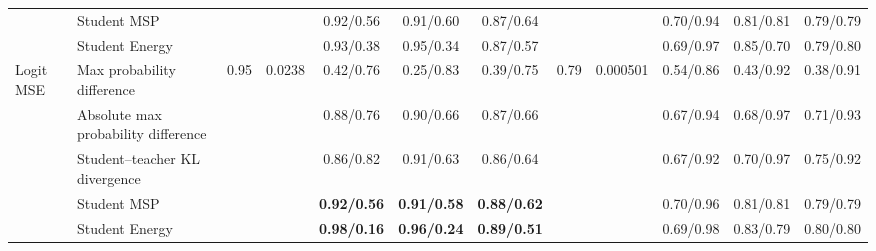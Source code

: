 \documentclass[border=2pt]{standalone}
\begin{document}
\begin{tabular}{llcccccccccc}
 & Student MSP &  &  & 0.92/0.56 & 0.91/0.60 & 0.87/0.64 &  &  & 0.70/0.94 & 0.81/0.81 & 0.79/0.79 \\
 & Student Energy &  &  & 0.93/0.38 & 0.95/0.34 & 0.87/0.57 &  &  & 0.69/0.97 & 0.85/0.70 & 0.79/0.80 \\
\addlinespace
Logit MSE & Max probability difference & 0.95 & 0.0238 & 0.42/0.76 & 0.25/0.83 & 0.39/0.75 & 0.79 & 0.000501 & 0.54/0.86 & 0.43/0.92 & 0.38/0.91 \\
 & Absolute max probability difference &  &  & 0.88/0.76 & 0.90/0.66 & 0.87/0.66 &  &  & 0.67/0.94 & 0.68/0.97 & 0.71/0.93 \\
 & Student--teacher KL divergence &  &  & 0.86/0.82 & 0.91/0.63 & 0.86/0.64 &  &  & 0.67/0.92 & 0.70/0.97 & 0.75/0.92 \\
 & Student MSP &  &  & \textbf{0.92/0.56} & \textbf{0.91/0.58} & \textbf{0.88/0.62} &  &  & 0.70/0.96 & 0.81/0.81 & 0.79/0.79 \\
 & Student Energy &  &  & \textbf{0.98/0.16} & \textbf{0.96/0.24} & \textbf{0.89/0.51} &  &  & 0.69/0.98 & 0.83/0.79 & 0.80/0.80 \\
\bottomrule
\end{tabular}
\end{document}
